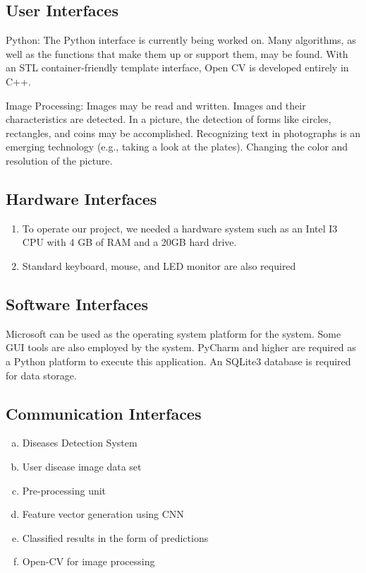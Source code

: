 \subsection{ User Interfaces}

Python: The Python interface is currently being worked on. Many algorithms, as well as the functions that make them up or support them, may be found. With an STL container-friendly template interface, Open CV is developed entirely in C++.

Image Processing: Images may be read and written. Images and their characteristics are detected. In a picture, the detection of forms like circles, rectangles, and coins may be accomplished. Recognizing text in photographs is an emerging technology (e.g., taking a look at the plates). Changing the color and resolution of the picture.

\subsection{Hardware Interfaces}

\begin{enumerate}
    \item To operate our project, we needed a hardware system such as an Intel I3 CPU with 4 GB of RAM and a 20GB hard drive.
    \item Standard keyboard, mouse, and LED monitor are also required
\end{enumerate}

\subsection{Software Interfaces}

Microsoft can be used as the operating system platform for the system. Some GUI tools are also employed by the system. PyCharm and higher are required as a Python platform to execute this application. An SQLite3 database is required for data storage.

\subsection{Communication Interfaces}

\begin{enumerate}[a)]
    \item Diseases Detection System
    \item User disease image data set
    \item Pre-processing unit
    \item Feature vector generation using CNN
    \item Classified results in the form of predictions
    \item Open-CV for image processing
\end{enumerate}

